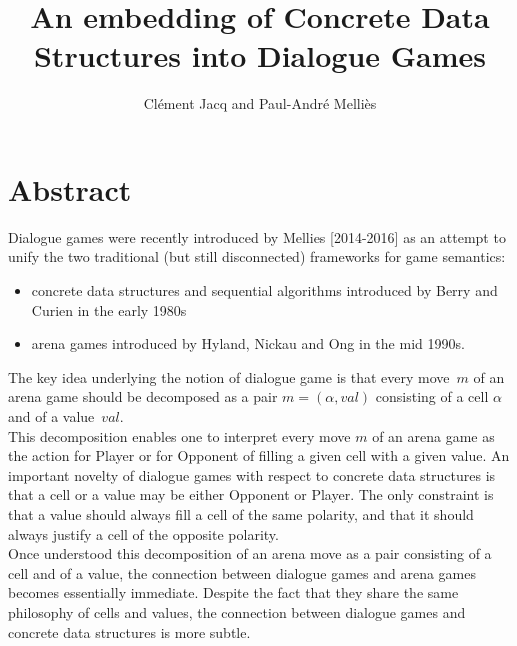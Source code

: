 \documentclass[11pt]{llncs} %
\title{An embedding of Concrete Data Structures into Dialogue Games}
\author{Clément Jacq and Paul-André Melliès\\}
\date{} %
\institute{Laboratoire IRIF, Université Paris Diderot}
\begin{document}
\maketitle
\section*{Abstract}
Dialogue games were recently introduced by Mellies [2014-2016]
as an attempt to unify the two traditional (but still disconnected)
frameworks for game semantics:
\begin{itemize}
\item concrete data structures and sequential algorithms introduced by Berry and Curien in the early 1980s
\item arena games introduced by Hyland, Nickau and Ong in the mid 1990s.
\end{itemize}
The key idea underlying the notion of dialogue game is that every move~$m$ 
of an arena game should be decomposed as a pair $m=(\alpha,val)$
consisting of a cell $\alpha$ and of a value~$val$.\\
This decomposition enables one to interpret every move $m$ of an arena game 
as the action for Player or for Opponent of filling a given cell with a given value.
An important novelty of dialogue games with respect to concrete data structures
is that a cell or a value may be either Opponent or Player.
The only constraint is that a value should always fill a cell of the same polarity,
and that it should always justify a cell of the opposite polarity.\\

Once understood this decomposition of an arena move as a pair consisting
of a cell and of a value, the connection between dialogue games and arena games becomes essentially immediate. Despite the fact that they share the same philosophy of cells and values,
the connection between dialogue games and concrete data structures is more subtle. \\
\end{document}
